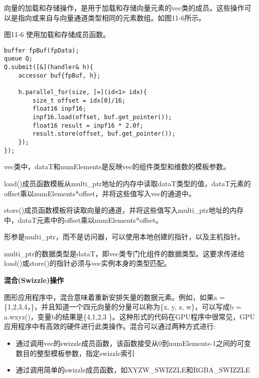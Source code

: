 向量的加载和存储操作，是用于加载和存储向量元素的vec类的成员。这些操作可以是指向或来自与向量通道类型相同的元素数组。如图11-6所示。\par

\hspace*{\fill} \par %
图11-6 使用加载和存储成员函数。
\begin{lstlisting}[caption={}]
buffer fpBuf(fpData);
queue Q;
Q.submit([&](handler& h){
	accessor buf{fpBuf, h};
	
	h.parallel_for(size, [=](id<1> idx){
		size_t offset = idx[0]/16;
		float16 inpf16;
		inpf16.load(offset, buf.get_pointer());
		float16 result = inpf16 * 2.0f;
		result.store(offset, buf.get_pointer());
	});
});
\end{lstlisting}

vec类中，dataT和numElements是反映vec的组件类型和维数的模板参数。\par

load()成员函数模板从multi\_ptr地址的内存中读取dataT类型的值，dataT元素的offset乘以numElements*offset，并将这些值写入vec的通道中。\par

store()成员函数模板将读取向量的通道，并将这些值写入multi\_ptr地址的内存中，dataT元素中的offset乘以numElements*offset。\par

形参是multi\_ptr，而不是访问器，可以使用本地创建的指针，以及主机指针。\par

multi\_ptr的数据类型是dataT，即vec类专门化组件的数据类型。这要求传递给load()或store()的指针必须与vec实例本身的类型匹配。\par

\hspace*{\fill} \par %
\textbf{混合(Swizzle)操作}

图形应用程序中，混合意味着重新安排矢量的数据元素。例如，如果a = \{1,2,3,4，\}，并且知道一个四元向量的分量可以称为\{x, y, z, w\}，可以写成b = a.wxyz()，变量b的结果是\{4,1,2,3 \}。这种形式的代码在GPU程序中很常见，GPU应用程序中有高效的硬件进行此类操作。混合可以通过两种方式进行:\par

\begin{itemize}
	\item 通过调用vec的swizzle成员函数，该函数接受从0到numElements-1之间的可变数目的整型模板参数，指定swizzle索引
	\item 通过调用简单的swizzle成员函数，如XYZW\_SWIZZLE和RGBA\_SWIZZLE
\end{itemize}

